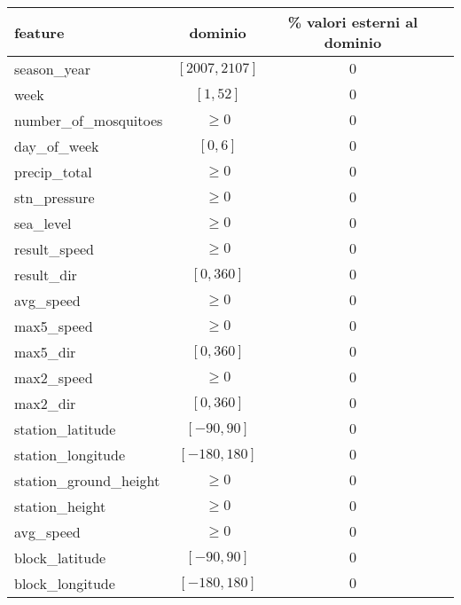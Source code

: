 \vspace{.5em}
\begin{centering}
	\begin{tabular}{lccc}
		\toprule
		feature & dominio & \% valori esterni al dominio \\
		\midrule
		season\_year & $[2007, 2107]$ & $0$ \\
		week &	$[1, 52]$ & $0$ \\
		number\_of\_mosquitoes &	$\geq 0$ & $0$ \\
		day\_of\_week &	$[0, 6]$ & $0$ \\
		precip\_total &	$\geq 0$ & $0$ \\
		stn\_pressure &	$\geq 0$ & $0$ \\
		sea\_level &	$\geq 0$ & $0$ \\
		result\_speed &	$\geq 0$ & $0$ \\
		result\_dir &	$[0, 360]$ & $0$ \\
		avg\_speed &	$\geq 0$ & $0$ \\
		max5\_speed &	$\geq 0$ & $0$ \\
		max5\_dir &	$[0, 360]$ & $0$ \\
		max2\_speed &	$\geq 0$ & $0$ \\
		max2\_dir &	$[0, 360]$ & $0$ \\
		station\_latitude & $[-90, 90]$ & $0$ \\
		station\_longitude & $[-180, 180]$ & $0$ \\
		station\_ground\_height &	$\geq 0$ & $0$ \\
		station\_height & $\geq 0$ & $0$ \\
		avg\_speed & $\geq 0$ & $0$ \\
		block\_latitude & $[-90, 90]$ & $0$ \\
		block\_longitude & $[-180, 180]$ & $0$ \\
		\bottomrule
	\end{tabular}
	\label{tab:features-accuracy}
\end{centering}
